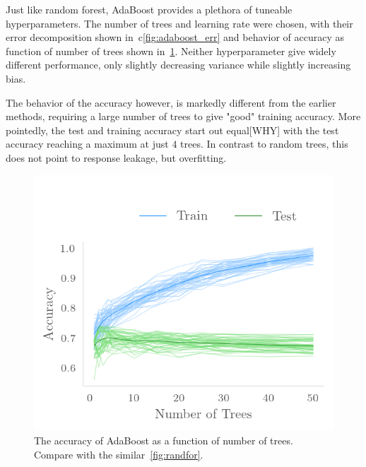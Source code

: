Just like random forest, AdaBoost provides a plethora of tuneable
hyperparameters. The number of trees and learning rate were chosen, with
their error decomposition shown in~c\ref{fig:adaboost_err} and behavior of
accuracy as function of number of trees shown in~\cref{fig:ada_trees}. 
Neither hyperparameter give widely different performance, only slightly decreasing 
variance while slightly increasing bias. 

The behavior of the accuracy however, is markedly different from the earlier methods, requiring a large number of trees to give "good" training accuracy. More 
pointedly, the test and training accuracy start out equal[WHY] with the test accuracy reaching a maximum at just $4$ trees. In contrast to random trees, this
does not point to response leakage, but overfitting. 

\begin{figure}[H]
    \centering
    \includegraphics{Figures/ada_bootstrap.png}
    \caption{The accuracy of AdaBoost as a function of number of trees.
    Compare with the similar~\cref{fig:randfor}.}
    \label{fig:ada_trees}
\end{figure}

